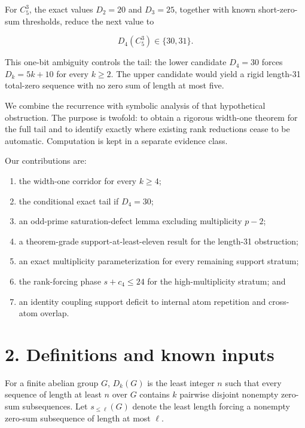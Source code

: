 \documentclass[
  11pt,
]{article}
\providecommand{\tightlist}{%
  \setlength{\itemsep}{0pt}\setlength{\parskip}{0pt}}
\begin{document}
For \(C_5^3\), the exact values \(D_2=20\) and \(D_3=25\), together with
known short-zero-sum thresholds, reduce the next value to

\[
D_4(C_5^3)\in\{30,31\}.
\]

This one-bit ambiguity controls the tail: the lower candidate \(D_4=30\)
forces \(D_k=5k+10\) for every \(k\ge2\). The upper candidate would
yield a rigid length-31 total-zero sequence with no zero sum of length
at most five.

We combine the recurrence with symbolic analysis of that hypothetical
obstruction. The purpose is twofold: to obtain a rigorous width-one
theorem for the full tail and to identify exactly where existing rank
reductions cease to be automatic. Computation is kept in a separate
evidence class.

Our contributions are:

\begin{enumerate}
\def\labelenumi{\arabic{enumi}.}
\tightlist
\item
  the width-one corridor for every \(k\ge4\);
\item
  the conditional exact tail if \(D_4=30\);
\item
  an odd-prime saturation-defect lemma excluding multiplicity \(p-2\);
\item
  a theorem-grade support-at-least-eleven result for the length-31
  obstruction;
\item
  an exact multiplicity parameterization for every remaining support
  stratum;
\item
  the rank-forcing phase \(s+c_4\le24\) for the high-multiplicity
  stratum; and
\item
  an identity coupling support deficit to internal atom repetition and
  cross-atom overlap.
\end{enumerate}

\hypertarget{definitions-and-known-inputs}{%
\section{2. Definitions and known
inputs}\label{definitions-and-known-inputs}}

For a finite abelian group \(G\), \(D_k(G)\) is the least integer \(n\)
such that every sequence of length at least \(n\) over \(G\) contains
\(k\) pairwise disjoint nonempty zero-sum subsequences. Let
\(s_{\le\ell}(G)\) denote the least length forcing a nonempty zero-sum
subsequence of length at most \(\ell\).
\end{document}
